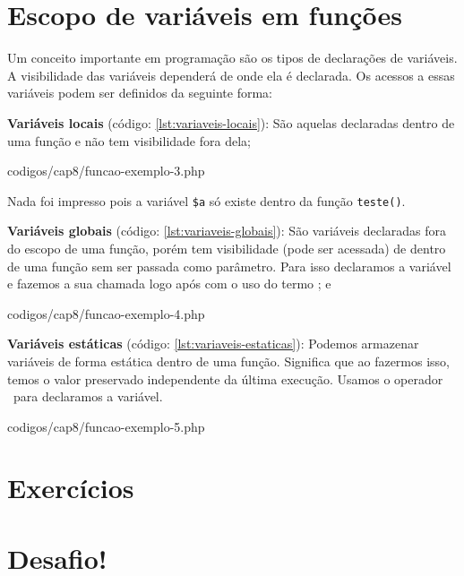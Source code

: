 \section{Escopo de variáveis em funções}
\label{escopo-de-variaveis-em-funcoes}

Um conceito importante em programação são os tipos de declarações de variáveis.
A visibilidade das variáveis dependerá de onde ela é declarada. Os acessos a essas 
variáveis podem ser definidos da seguinte forma:

\textbf{Variáveis locais} (código: \ref{lst:variaveis-locais}): São aquelas 
  declaradas dentro de uma função e não tem visibilidade fora dela;


{codigos/cap8/funcao-exemplo-3.php}

Nada foi impresso pois a variável \texttt{\$a} só existe dentro da função \texttt{teste()}.

\textbf{Variáveis globais} (código: \ref{lst:variaveis-globais}): São variáveis 
  declaradas fora do escopo de uma função, porém tem visibilidade (pode ser acessada) 
  de dentro de uma função sem ser passada como parâmetro. Para isso declaramos a 
  variável e fazemos a sua chamada logo após com o uso do termo \comandoglobal; e


{codigos/cap8/funcao-exemplo-4.php}

\textbf{Variáveis estáticas} (código: \ref{lst:variaveis-estaticas}): Podemos 
  armazenar variáveis de forma estática dentro de uma função. Significa que ao 
  fazermos isso, temos o valor preservado independente da última execução. 
  Usamos o operador \comandostatic~para declaramos a variável. 


{codigos/cap8/funcao-exemplo-5.php}

\section{Exercícios}
\label{cap8-exercicios}

\section{Desafio!}
\label{cap8-desafio}